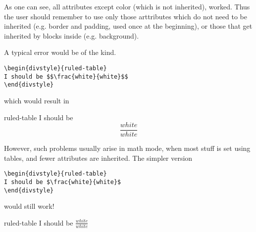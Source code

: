 \documentclass {article}
\begin{document}
As one can see, all attributes except color (which is not inherited), worked. Thus the user should remember to use only those arttributes which do not need to be inherited (e.g. border and padding, used once at the beginning), or those that get inherited by blocks inside (e.g. background).

A typical error would be of the kind.
\begin{verbatim}
\begin{divstyle}{ruled-table}
I should be $$\frac{white}{white}$$
\end{divstyle}
\end{verbatim}
which would result in

\begin{divstyle}{ruled-table}
I should be $$\frac{white}{white}$$
\end{divstyle}

However, such problems usually arise in math mode, when most stuff is set using tables, and fewer attributes are inherited. The simpler version
 \begin{verbatim}
\begin{divstyle}{ruled-table}
I should be $\frac{white}{white}$
\end{divstyle}
\end{verbatim}
would still work!

\begin{divstyle}{ruled-table}
I should be $\frac{white}{white}$
\end{divstyle}

\label {options}
\end{document}
